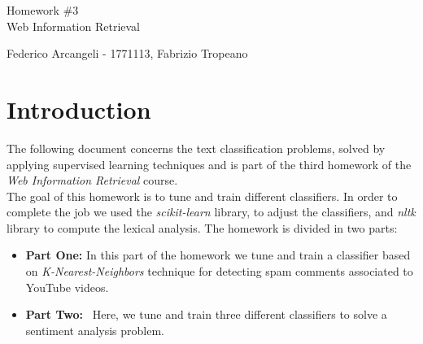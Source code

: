 \documentclass[11pt]{article}
\begin{document}
\begin{titlepage}
	\begin{center}
		\vspace*{\fill}
		\begin{Huge}
			Homework \#3\\
			
			
			Web Information Retrieval
		\end{Huge}
		\newline
		\newline
		Federico Arcangeli \-- 1771113, Fabrizio Tropeano \\
		\vspace*{\fill}	
	\end{center}
\end{titlepage}


\section{Introduction}
The following document concerns the text classification problems, solved by applying supervised learning techniques and is part of the third homework of the \textit{Web Information Retrieval} course.\\
The goal of this homework is to tune and train different classifiers. In order to complete the job we used the \textit{scikit-learn} library, to adjust the classifiers, and \textit{nltk} library to compute the lexical analysis.
The homework is divided in two parts: 
\begin{itemize}
\item{\textbf{Part One:} } In this part of the homework we tune and train a classifier based on \textit{K-Nearest-Neighbors} technique for detecting spam comments associated to YouTube videos.
\item{\textbf{Part Two:} } Here, we tune and train three different classifiers to solve a sentiment analysis problem.
\end{itemize}
\end{document}
